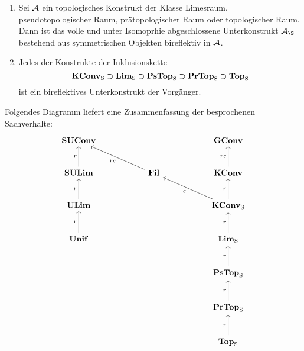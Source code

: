 \begin{prop}
  \begin{enumerate}[1)]
    \item Sei $\mathcal{A}$ ein topologisches Konstrukt der Klasse Limesraum, pseudotopologischer Raum, prätopologischer Raum oder topologischer Raum.
      Dann ist das volle und unter Isomoprhie abgeschlossene Unterkonstrukt $\A_\S$ bestehend aus symmetrischen Objekten bireflektiv in $\mathcal{A}$.
    \item Jedes der Konstrukte der Inklusionskette
      $$
      \mathbf{KConv}_{\mathrm{S}} \supset \mathbf{Lim}_{\mathrm{S}} \supset \mathbf{PsTop}_{\mathrm{S}} \supset \mathbf{PrTop}_{\mathrm{S}} \supset \mathbf{Top}_{\mathrm{S}}
      $$
      ist ein bireflektives Unterkonstrukt der Vorgänger.
  \end{enumerate}
\end{prop}


Folgendes Diagramm liefert eine Zusammenfassung der besprochenen Sachverhalte:
$$
\begin{tikzcd}[column sep=5.5em,row sep=2.5em]
  \SUConv              &        & \GConv \\
  \SULim \arrow[u,"r"] &  \Fil\arrow[lu,"rc"]  & \KConv   \arrow[u,"rc"] \\
  \ULim  \arrow[u,"r"] &        & \KConv_\Sy \arrow[lu,"c"]    \arrow[u,"r"]    \\
  \Unif  \arrow[u,"r"] &        & \Lim_\Sy   \arrow[u,"r"]    \\
                       &        & \PsTop_\Sy \arrow[u,"r"]    \\
                       &        & \PrTop_\Sy \arrow[u,"r"]    \\
                       &        & \Top_\Sy   \arrow[u,"r"]    
\end{tikzcd}
$$
